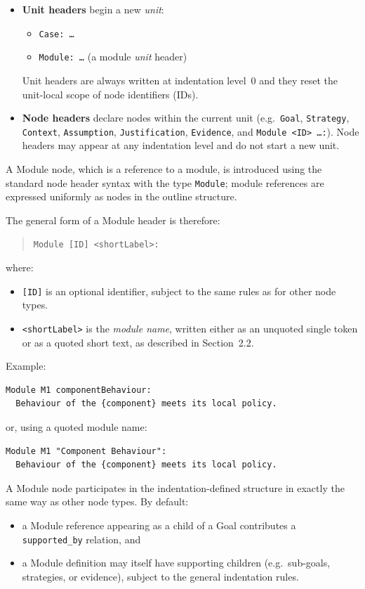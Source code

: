 \documentclass[11pt]{article}
\begin{document}
\begin{itemize}[leftmargin=2em]
  \item \textbf{Unit headers} begin a new \emph{unit}:
  \begin{itemize}[leftmargin=1.5em]
    \item \texttt{Case: \dots}
    \item \texttt{Module: \dots} (a module \emph{unit} header)
  \end{itemize}
  Unit headers are always written at indentation level~0 and they reset the unit-local scope of node identifiers (IDs).
  \item \textbf{Node headers} declare nodes within the current unit (e.g.\ \texttt{Goal}, \texttt{Strategy}, \texttt{Context}, \texttt{Assumption}, \texttt{Justification}, \texttt{Evidence}, and \texttt{Module <ID> \dots :}).
  Node headers may appear at any indentation level and do not start a new unit.
\end{itemize}

A Module node, which is a reference to a module, is introduced using the standard node header syntax with the type
\texttt{Module};
module references are expressed uniformly as nodes in the outline structure.

The general form of a Module header is therefore:
\begin{quote}
\texttt{Module [ID] \textless shortLabel\textgreater:}
\end{quote}

where:
\begin{itemize}[leftmargin=2em]
  \item \texttt{[ID]} is an optional identifier, subject to the same rules as for other node types.
  \item \texttt{\textless shortLabel\textgreater{}} is the \emph{module name}, written either as an
        unquoted single token or as a quoted short text, as described in Section~2.2.
\end{itemize}

Example:
\begin{verbatim}
Module M1 componentBehaviour:
  Behaviour of the {component} meets its local policy.
\end{verbatim}

or, using a quoted module name:
\begin{verbatim}
Module M1 "Component Behaviour":
  Behaviour of the {component} meets its local policy.
\end{verbatim}

A Module node participates in the indentation-defined structure in exactly the same way as
other node types. By default:
\begin{itemize}[leftmargin=2em]
  \item a Module reference appearing as a child of a Goal contributes a
        \texttt{supported\_by} relation, and
  \item a Module definition may itself have supporting children (e.g.\ sub-goals, strategies, or evidence),
        subject to the general indentation rules.
\end{itemize}
\end{document}
